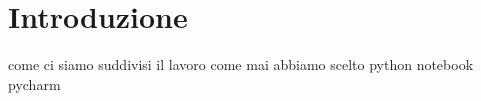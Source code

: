 \section{Introduzione}


come ci siamo suddivisi il lavoro
come mai abbiamo scelto python notebook pycharm 

\pagebreak
